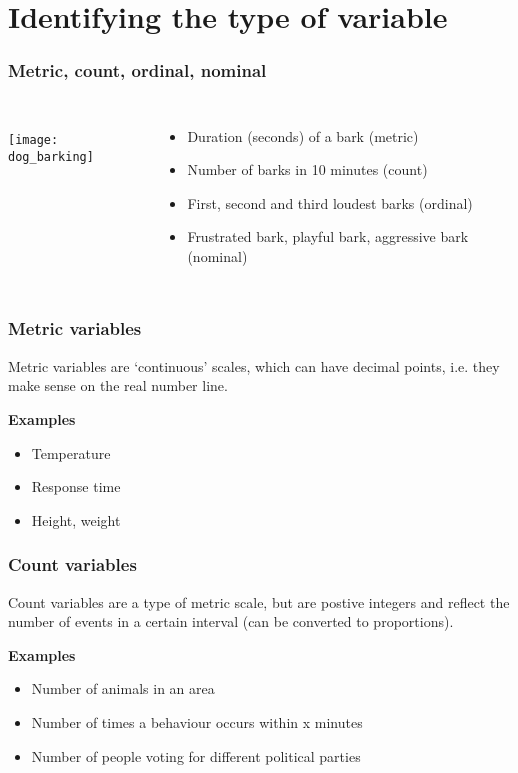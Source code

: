 \documentclass{beamer}
\begin{document}
\section{Identifying the type of variable}
\begin{frame}
  \frametitle{Metric, count, ordinal, nominal}
  \begin{columns}
    \\
  \vspace{-2cm}
  \texttt{[image: dog\_barking]}

  \begin{itemize}
    \item<1-> Duration (seconds) of a bark (\alert{metric})
    \item<2-> Number of barks in 10 minutes (\alert{count})
    \item<3-> First, second and third loudest barks (\alert{ordinal})
    \item<4> Frustrated bark, playful bark, aggressive bark (\alert{nominal})
  \end{itemize}
\end{columns}
\end{frame}
\begin{frame}
  \frametitle{Metric variables}
  Metric variables are `continuous' scales, which can have \alert{decimal points}, i.e. they make sense on the real number line. \\ \vspace{0.5cm}
  \begin{block}{\textbf{Examples}}
    \begin{itemize}
      \item Temperature
      \item Response time
      \item Height, weight
    \end{itemize}
  \end{block}
\end{frame}
\begin{frame}
  \frametitle{Count variables}
  Count variables are a type of metric scale, but are \alert{postive integers} and reflect the number of events in a certain interval (can be converted to proportions). \\ \vspace{0.5cm}
  \begin{block}{\textbf{Examples}}
    \begin{itemize}
      \item Number of animals in an area
      \item Number of times a behaviour occurs within x minutes
      \item Number of people voting for different political parties
    \end{itemize}
  \end{block}
\end{frame}
\end{document}
